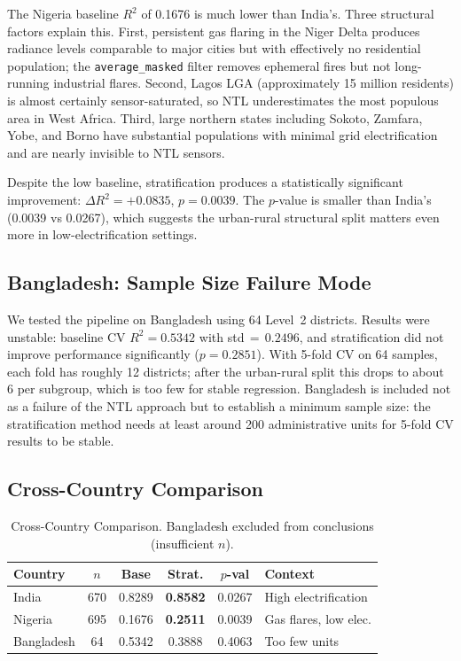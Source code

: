 \documentclass[conference]{IEEEtran}
\begin{document}
The Nigeria baseline $R^2$ of 0.1676 is much lower than India's. Three structural factors explain this. First, persistent gas flaring in the Niger Delta produces radiance levels comparable to major cities but with effectively no residential population; the \texttt{average\_masked} filter removes ephemeral fires but not long-running industrial flares. Second, Lagos LGA (approximately 15 million residents) is almost certainly sensor-saturated, so NTL underestimates the most populous area in West Africa. Third, large northern states including Sokoto, Zamfara, Yobe, and Borno have substantial populations with minimal grid electrification and are nearly invisible to NTL sensors.

Despite the low baseline, stratification produces a statistically significant improvement: $\Delta R^2{=}{+}0.0835$, $p{=}0.0039$. The $p$-value is smaller than India's (0.0039 vs 0.0267), which suggests the urban-rural structural split matters even more in low-electrification settings.

\subsection{Bangladesh: Sample Size Failure Mode}

We tested the pipeline on Bangladesh using 64 Level~2 districts. Results were unstable: baseline CV $R^2{=}0.5342$ with std$\,{=}\,0.2496$, and stratification did not improve performance significantly ($p{=}0.2851$). With 5-fold CV on 64 samples, each fold has roughly 12 districts; after the urban-rural split this drops to about 6 per subgroup, which is too few for stable regression. Bangladesh is included not as a failure of the NTL approach but to establish a minimum sample size: the stratification method needs at least around 200 administrative units for 5-fold CV results to be stable.

\subsection{Cross-Country Comparison}

\begin{table}[!t]
\caption{Cross-Country Comparison. Bangladesh excluded from conclusions (insufficient $n$).}
\label{tab:crosscountry}
\centering
\renewcommand{\arraystretch}{1.2}
\begin{tabular}{lccccp{1.8cm}}
\toprule
\textbf{Country} & \textbf{$n$} & \textbf{Base} & \textbf{Strat.} & \textbf{$p$-val} & \textbf{Context} \\
\midrule
India       & 670 & 0.8289 & \textbf{0.8582} & 0.0267 & High electrification \\
Nigeria     & 695 & 0.1676 & \textbf{0.2511} & 0.0039 & Gas flares, low elec. \\
Bangladesh  & 64  & 0.5342 & 0.3888          & 0.4063 & Too few units \\
\bottomrule
\end{tabular}
\end{table}
\end{document}
